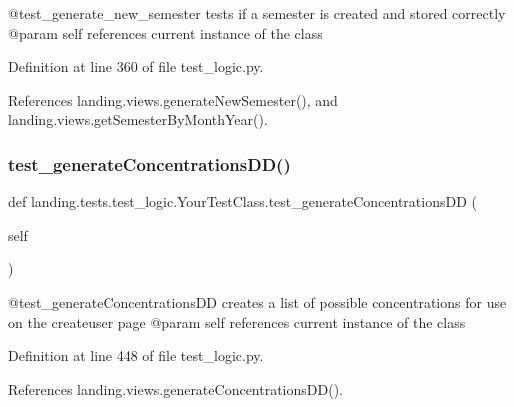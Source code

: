 \begin{DoxyVerb}@test_generate_new_semester tests if a semester is created and stored correctly
@param self references current instance of the class
\end{DoxyVerb}
 

Definition at line 360 of file test\+\_\+logic.\+py.



References landing.\+views.\+generate\+New\+Semester(), and landing.\+views.\+get\+Semester\+By\+Month\+Year().

\mbox{\label{classlanding_1_1tests_1_1test__logic_1_1YourTestClass_a299e310958f4c2310742a166666ce54a}} 
\subsubsection{\texorpdfstring{test\+\_\+generate\+Concentrations\+D\+D()}{test\_generateConcentrationsDD()}}
{\footnotesize\ttfamily def landing.\+tests.\+test\+\_\+logic.\+Your\+Test\+Class.\+test\+\_\+generate\+Concentrations\+DD (\begin{DoxyParamCaption}\item[{}]{self }\end{DoxyParamCaption})}

\begin{DoxyVerb}@test_generateConcentrationsDD creates a list of possible concentrations for use on the createuser page
@param self references current instance of the class
\end{DoxyVerb}
 

Definition at line 448 of file test\+\_\+logic.\+py.



References landing.\+views.\+generate\+Concentrations\+D\+D().

\mbox{\label{classlanding_1_1tests_1_1test__logic_1_1YourTestClass_a3bd96c391d99f1099fdd3145ec8bb244}} 
